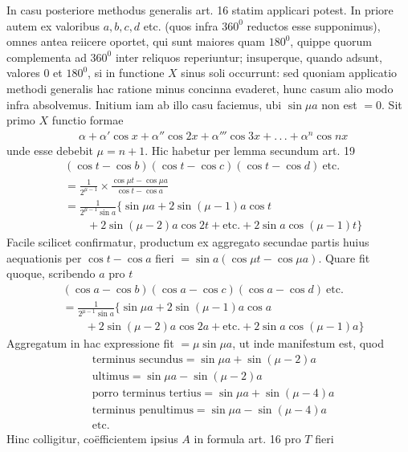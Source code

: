 In casu posteriore methodus generalis art. 16 statim applicari potest. In priore autem ex valoribus $a,b,c,d$ etc. (quos infra $360^{0}$ reductos esse supponimus), omnes antea reiicere oportet, qui sunt maiores quam $180^{0}$, quippe quorum complementa ad $360^{0}$ inter reliquos reperiuntur; insuperque, quando adsunt, valores $0$ et $180^{0}$, si in functione $X$ sinus soli occurrunt: sed quoniam applicatio methodi generalis hac ratione minus concinna evaderet, hunc casum alio modo infra absolvemus. Initium iam ab illo casu faciemus, ubi $\sin\mu a$ non est $=0$.
Sit primo $X$ functio formae
\[
\begin{aligned}
&\alpha+\alpha'\cos x+\alpha''\cos2x+\alpha'''\cos3x+.\,.\,.+\alpha^{n}\cos nx
\end{aligned}
\]
unde esse debebit $\mu=n+1$. Hic habetur per lemma secundum art. 19
\[
\begin{aligned}
&(\cos t-\cos b)(\cos t-\cos c)(\cos t-\cos d)\ \text{etc.}
\\[5pt]
&=\frac1{2^{\mu-1}}\times\frac{\cos\mu t-\cos\mu a}{\cos t-\cos a}\\[5pt]
&=\frac1{2^{\mu-1}\sin a}\{\sin\mu a+2\sin(\mu-1)a\cos t\\[5pt]
&\qquad{}+2\sin(\mu-2)a\cos2t+\text{etc.}+2\sin a\cos(\mu-1)t\}
\end{aligned}
\]
Facile scilicet confirmatur, productum ex aggregato secundae partis huius aequationis per $\cos t-\cos a$ fieri $=\sin a(\cos\mu t-\cos\mu a)$. Quare fit quoque, scribendo $a$ pro $t$
\[
\begin{aligned}
&(\cos a-\cos b)(\cos a-\cos c)(\cos a-\cos d)\ \text{etc.}
\\[5pt]
&=\frac1{2^{\mu-1}\sin a}\{\sin\mu a+2\sin(\mu-1)a\cos a\\[5pt]
&\qquad+2\sin(\mu-2)a\cos2a+\text{etc.}+2\sin a\cos(\mu-1)a\}
\end{aligned}
\]
Aggregatum in hac expressione fit $=\mu\sin\mu a$, ut inde manifestum est, quod
\[
\begin{aligned}
&\text{terminus secundus}=\sin\mu a+\sin(\mu-2)a\\[5pt]
&\text{ultimus}=\sin\mu a-\sin(\mu-2)a\\[5pt]
&\text{porro terminus tertius}=\sin\mu a+\sin(\mu-4)a\\[5pt]
&\text{terminus penultimus}=\sin\mu a-\sin(\mu-4)a\\[5pt]
&\text{etc.}
\end{aligned}
\]
Hinc colligitur, coëfficientem ipsius $A$ in formula art. 16 pro $T$ fieri
